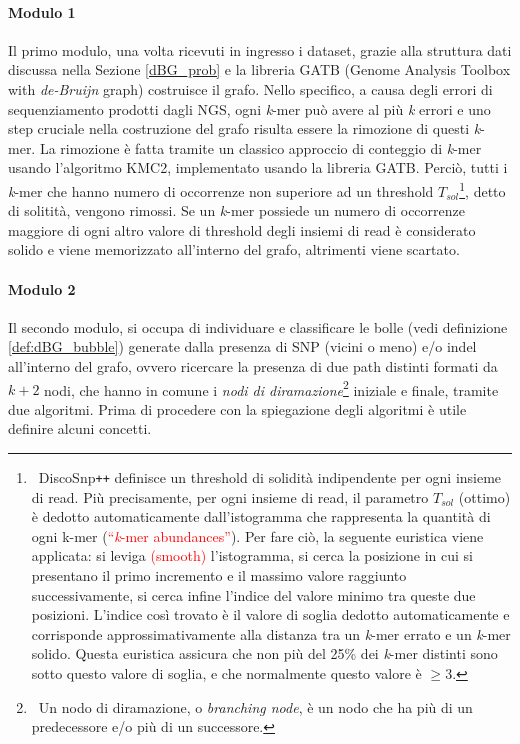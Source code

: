 \documentclass[../main.tex]{subfiles}
\begin{document}
\paragraph{Modulo 1} Il primo modulo, una volta ricevuti in ingresso i dataset, grazie alla struttura dati discussa nella Sezione \ref{dBG_prob} e la libreria GATB (Genome Analysis Toolbox with \textit{de-Bruijn} graph) costruisce il grafo. Nello specifico, a causa degli errori di sequenziamento prodotti dagli NGS, ogni \textit{k}-mer può avere al più \textit{k} errori e uno step cruciale nella costruzione del grafo risulta essere la rimozione di questi \textit{k}-mer. La rimozione è fatta tramite un classico approccio di conteggio di \textit{k}-mer usando l'algoritmo KMC2, implementato usando la libreria GATB. Perciò, tutti i \textit{k}-mer che hanno numero di occorrenze non superiore ad un threshold $T_{sol}$\footnote{\ DiscoSnp\texttt{++} definisce un threshold di solidità indipendente per ogni insieme di read. Più precisamente, per ogni insieme di read, il parametro $T_{sol}$ (ottimo) è dedotto automaticamente dall'istogramma che rappresenta la quantità di ogni k-mer (\textcolor{red}{``\textit{k}-mer abundances''}). Per fare ciò, la seguente euristica viene applicata: si leviga  \textcolor{red}{(smooth)} l'istogramma, si cerca la posizione in cui si presentano il primo incremento e il massimo valore raggiunto successivamente, si cerca infine l'indice del valore minimo tra queste due posizioni. L'indice così trovato è il valore di soglia dedotto automaticamente e corrisponde approssimativamente alla distanza tra un \textit{k}-mer errato e un \textit{k}-mer solido. Questa euristica assicura che non più del 25\% dei \textit{k}-mer distinti sono sotto questo valore di soglia, e che normalmente questo valore è $\geq3$.}, detto di solitità, vengono rimossi. Se  un \textit{k}-mer possiede un numero di occorrenze maggiore di ogni altro valore di threshold degli insiemi di read è considerato solido e viene memorizzato all'interno del grafo, altrimenti viene scartato.

\paragraph{Modulo 2} Il secondo modulo, si occupa di individuare e classificare le bolle (vedi definizione \ref{def:dBG_bubble}) generate dalla presenza di SNP (vicini o meno) e/o indel all'interno del grafo, ovvero ricercare la presenza di due path distinti formati da $k+2$ nodi, che hanno in comune i \textit{nodi di diramazione}\footnote{\ Un nodo di diramazione, o \textit{branching node}, è un nodo che ha più di un predecessore e/o più di un successore.} iniziale e finale, tramite due algoritmi. Prima di procedere con la spiegazione degli algoritmi è utile definire alcuni concetti.
\end{document}
